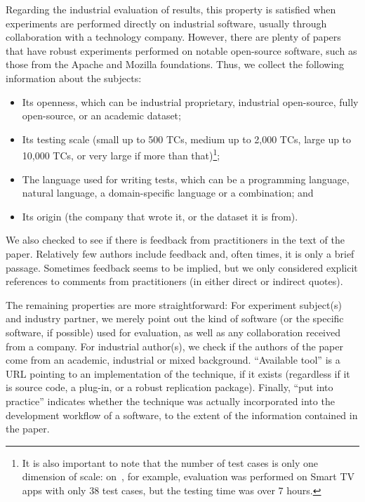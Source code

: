 Regarding the industrial evaluation of results, this property is satisfied when experiments are performed directly on industrial software, usually through collaboration with a technology company.
However, there are plenty of papers that have robust experiments performed on notable open-source software, such as those from the Apache and Mozilla foundations.
Thus, we collect the following information about the subjects:
\begin{itemize}
	\item Its openness, which can be industrial proprietary, industrial open-source, fully open-source, or an academic dataset;
	\item Its testing scale (small up to 500 TCs, medium up to 2,000 TCs, large up to 10,000 TCs, or very large if more than that)\footnote{It is also important to note that the number of test cases is only one dimension of scale: on~, for example, evaluation was performed on Smart TV apps with only 38 test cases, but the testing time was over 7 hours.};
	\item The language used for writing tests, which can be a programming language, natural language, a domain-specific language or a combination; and
	\item Its origin (the company that wrote it, or the dataset it is from).
\end{itemize}

We also checked to see if there is feedback from practitioners in the text of the paper.
Relatively few authors include feedback and, often times, it is only a brief passage.
Sometimes feedback seems to be implied, but we only considered explicit references to comments from practitioners (in either direct or indirect quotes).

The remaining properties are more straightforward:
For experiment subject(s) and industry partner, we merely point out the kind of software (or the specific software, if possible) used for evaluation, as well as any collaboration received from a company.
For industrial author(s), we check if the authors of the paper come from an academic, industrial or mixed background.
``Available tool'' is a URL pointing to an implementation of the technique, if it exists (regardless if it is source code, a plug-in, or a robust replication package).
Finally, ``put into practice'' indicates whether the technique was actually incorporated into the development workflow of a software, to the extent of the information contained in the paper.

